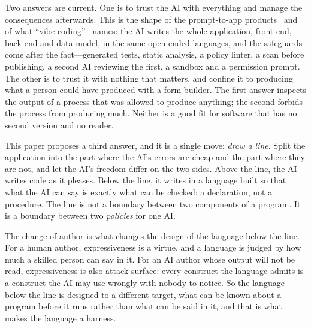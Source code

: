 \documentclass[11pt]{article}
\begin{document}
Two answers are current. One is to trust the AI with everything and manage the consequences afterwards. This is the shape of the prompt-to-app products~\cite{vibetools2026} and of what ``vibe coding''~\cite{karpathy2025vibe} names: the AI writes the whole application, front end, back end and data model, in the same open-ended languages, and the safeguards come after the fact---generated tests, static analysis, a policy linter, a scan before publishing, a second AI reviewing the first, a sandbox and a permission prompt. The other is to trust it with nothing that matters, and confine it to producing what a person could have produced with a form builder. The first answer inspects the output of a process that was allowed to produce anything; the second forbids the process from producing much. Neither is a good fit for software that has no second version and no reader.

This paper proposes a third answer, and it is a single move: \emph{draw a line}. Split the application into the part where the AI's errors are cheap and the part where they are not, and let the AI's freedom differ on the two sides. Above the line, the AI writes code as it pleases. Below the line, it writes in a language built so that what the AI can say is exactly what can be checked: a declaration, not a procedure. The line is not a boundary between two components of a program. It is a boundary between two \emph{policies} for one AI.

The change of author is what changes the design of the language below the line. For a human author, expressiveness is a virtue, and a language is judged by how much a skilled person can say in it. For an AI author whose output will not be read, expressiveness is also attack surface: every construct the language admits is a construct the AI may use wrongly with nobody to notice. So the language below the line is designed to a different target, what can be known about a program before it runs rather than what can be said in it, and that is what makes the language a harness.
\end{document}
